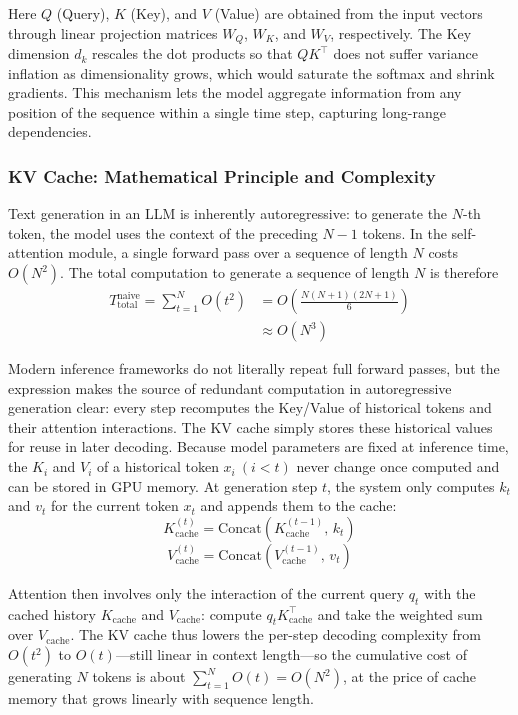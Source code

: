 \documentclass[pdflatex,iicol,Numbered,sn-basic]{sn-jnl}%
\begin{document}
Here $Q$ (Query), $K$ (Key), and $V$ (Value) are obtained from the input vectors through linear projection matrices $W_Q$, $W_K$, and $W_V$, respectively. The Key dimension $d_k$ rescales the dot products so that $QK^{\top}$ does not suffer variance inflation as dimensionality grows, which would saturate the softmax and shrink gradients. This mechanism lets the model aggregate information from any position of the sequence within a single time step, capturing long-range dependencies.

\subsubsection{KV Cache: Mathematical Principle and Complexity}

Text generation in an LLM is inherently autoregressive: to generate the $N$-th token, the model uses the context of the preceding $N-1$ tokens. In the self-attention module, a single forward pass over a sequence of length $N$ costs $O(N^{2})$. The total computation to generate a sequence of length $N$ is therefore
\begin{align}
T_{\mathrm{total}}^{\mathrm{naive}}=\sum_{t=1}^{N}O(t^{2})&=O\!\left(\frac{N(N+1)(2N+1)}{6}\right) \nonumber\\
&\approx O(N^{3})
\label{eq:naive}
\end{align}

Modern inference frameworks do not literally repeat full forward passes, but the expression makes the source of redundant computation in autoregressive generation clear: every step recomputes the Key/Value of historical tokens and their attention interactions. The KV cache simply stores these historical values for reuse in later decoding. Because model parameters are fixed at inference time, the $K_i$ and $V_i$ of a historical token $x_i\ (i<t)$ never change once computed and can be stored in GPU memory. At generation step $t$, the system only computes $k_t$ and $v_t$ for the current token $x_t$ and appends them to the cache:
\begin{equation}
K_{\mathrm{cache}}^{(t)}=\mathrm{Concat}\left(K_{\mathrm{cache}}^{(t-1)},\,k_t\right)
\label{eq:kcache}
\end{equation}
\begin{equation}
V_{\mathrm{cache}}^{(t)}=\mathrm{Concat}\left(V_{\mathrm{cache}}^{(t-1)},\,v_t\right)
\label{eq:vcache}
\end{equation}

Attention then involves only the interaction of the current query $q_t$ with the cached history $K_{\mathrm{cache}}$ and $V_{\mathrm{cache}}$: compute $q_t K_{\mathrm{cache}}^{\top}$ and take the weighted sum over $V_{\mathrm{cache}}$. The KV cache thus lowers the per-step decoding complexity from $O(t^{2})$ to $O(t)$---still linear in context length---so the cumulative cost of generating $N$ tokens is about $\sum_{t=1}^{N}O(t)=O(N^{2})$, at the price of cache memory that grows linearly with sequence length.
\end{document}
